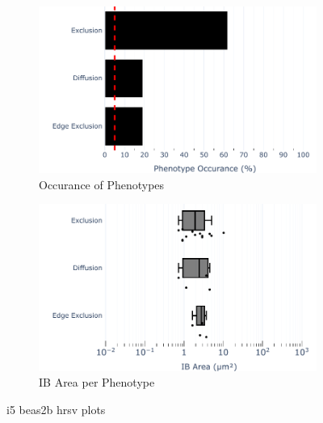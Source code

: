\begin{figure}
    \begin{subfigure}{0.5\textwidth}
        \includegraphics[width=1\linewidth]{09. Chapter 4/Figs/02. Infection/03. IFIT5/04. bar_i5_beas2b.pdf} 
        \caption[]{Occurance of Phenotypes}
    \end{subfigure}
    \begin{subfigure}{0.5\textwidth}
        \includegraphics[width=1\linewidth]{09. Chapter 4/Figs/02. Infection/03. IFIT5/05. box_i5_beas2b.pdf}
        \caption[]{IB Area per Phenotype}
    \end{subfigure}
    \caption[i5 beas2b hrsv plots]{i5 beas2b hrsv plots}
    \label{fig:i5 beas2b hrsv plots}
\end{figure}

